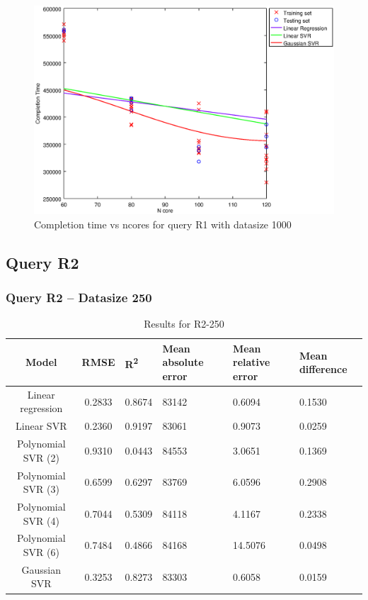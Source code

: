 \documentclass[a4paper,11pt]{article}
\begin{document}
\begin {figure}[hbtp]
\centering
\includegraphics[width=\textwidth]{output/R1_1000_LINEAR_NCORE/plot_R1_1000_bestmodels.eps}
\caption{Completion time vs ncores for query R1 with datasize 1000}
\label{fig:all_linear_R1_1000}
\end {figure}

\newpage
\subsection{Query R2}
\subsubsection{Query R2 -- Datasize 250}
\begin{table}[H]
	\centering
	\begin{adjustbox}{center}
		\begin{tabular}{c | c M{1.2cm} M{2.5cm} M{2.5cm} M{1.8cm}}
			Model & RMSE & R\textsuperscript{2} & Mean absolute error & Mean relative error & Mean difference \tabularnewline
			\hline
			Linear regression & 0.2833 & 0.8674 &  83142 & 0.6094 & 0.1530 \\
			Linear SVR & 0.2360 & 0.9197 &  83061 & 0.9073 & 0.0259 \\
			Polynomial SVR (2) & 0.9310 & 0.0443 &  84553 & 3.0651 & 0.1369 \\
			Polynomial SVR (3) & 0.6599 & 0.6297 &  83769 & 6.0596 & 0.2908 \\
			Polynomial SVR (4) & 0.7044 & 0.5309 &  84118 & 4.1167 & 0.2338 \\
			Polynomial SVR (6) & 0.7484 & 0.4866 &  84168 & 14.5076 & 0.0498 \\
			Gaussian SVR & 0.3253 & 0.8273 &  83303 & 0.6058 & 0.0159 \\
		\end{tabular}
	\end{adjustbox}
	\\
	\caption{Results for R2-250}
	\label{fig:all_linear_R2_250}
\end{table}
\end{document}
